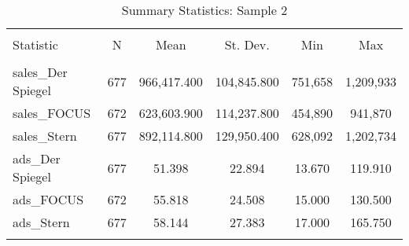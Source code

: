
\begin{table}[!htbp] \centering 
  \caption{Summary Statistics: Sample 2} 
  \label{t_sum_fss} 
\begin{tabular}{@{\extracolsep{5pt}}lccccc} 
\\[-1.8ex]\hline 
\hline \\[-1.8ex] 
Statistic & \multicolumn{1}{c}{N} & \multicolumn{1}{c}{Mean} & \multicolumn{1}{c}{St. Dev.} & \multicolumn{1}{c}{Min} & \multicolumn{1}{c}{Max} \\ 
\hline \\[-1.8ex] 
sales\_Der Spiegel & 677 & 966,417.400 & 104,845.800 & 751,658 & 1,209,933 \\ 
sales\_FOCUS & 672 & 623,603.900 & 114,237.800 & 454,890 & 941,870 \\ 
sales\_Stern & 677 & 892,114.800 & 129,950.400 & 628,092 & 1,202,734 \\ 
ads\_Der Spiegel & 677 & 51.398 & 22.894 & 13.670 & 119.910 \\ 
ads\_FOCUS & 672 & 55.818 & 24.508 & 15.000 & 130.500 \\ 
ads\_Stern & 677 & 58.144 & 27.383 & 17.000 & 165.750 \\ 
\hline \\[-1.8ex] 
\end{tabular} 
\end{table} 
